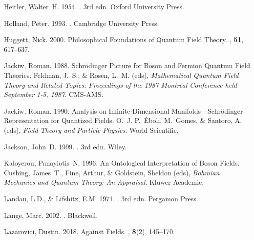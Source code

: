 \documentclass[onecolumn,secnumarabic,amsmath,amssymb,balancelastpage,nofootinbib]{article}
\begin{document}
\begin{thebibliography}{}
Heitler, Walter~H. 1954.
. 3rd edn.
\newblock Oxford University Press.

Holland, Peter. 1993.
.
\newblock Cambridge University Press.

Huggett, Nick. 2000.
\newblock Philosophical Foundations of Quantum Field Theory.
, {\bf 51},
  617--637.

Jackiw, Roman. 1988.
\newblock Schr\"{o}dinger Picture for Boson and Fermion Quantum Field Theories.
 Feldman, J.~S., \& Rosen, L.~M. (eds), {\em
  Mathematical Quantum Field Theory and Related Topics: Proceedings of the 1987
  Montr\'{e}al Conference held September 1-5, 1987}.
\newblock CMS-AMS.

Jackiw, Roman. 1990.
\newblock Analysis on Infinite-Dimensional Manifolds---Schr\"{o}dinger
  Representation for Quantized Fields.
 O.~J. P.~\'{E}boli, M.~Gomes, \& Santoro, A.
  (eds), {\em Field Theory and Particle Physics}.
\newblock World Scientific.

Jackson, John~D. 1999.
. 3rd edn.
\newblock Wiley.

Kaloyerou, Panayiotis~N. 1996.
\newblock An Ontological Interpretation of Boson Fields.
 Cushing, James~T., Fine, Arthur, \&
  Goldstein, Sheldon (eds), {\em Bohmian Mechanics and Quantum Theory: An
  Appraisal}.
\newblock Kluwer Academic.

Landau, L.D., \& Lifshitz, E.M. 1971.
. 3rd edn.
\newblock Pergamon Press.

Lange, Marc. 2002.
.
\newblock Blackwell.

Lazarovici, Dustin. 2018.
\newblock Against Fields.
, {\bf 8}(2),
  145--170.


\end{thebibliography}
\end{document}
